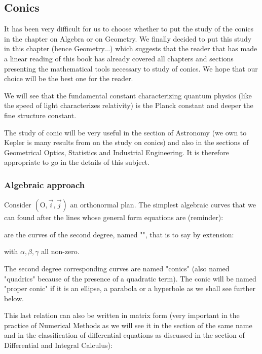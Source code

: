 	\subsection{Conics}\label{conics}
	It has been very difficult for us to choose whether to put the study of the conics in the chapter on Algebra or on Geometry. We finally decided to put this study in this chapter (hence Geometry...) which suggests that the reader that has made a linear reading of this book has already covered all chapters and sections presenting the mathematical tools necessary to study of conics. We hope that our choice will be the best one for the reader.

	\begin{tcolorbox}[title=Remark,colframe=black,arc=10pt]
	We will see that the fundamental constant characterizing quantum physics (like the speed of light characterizes relativity) is the Planck constant and deeper the fine structure constant.
	\end{tcolorbox}	
	
	The study of conic will be very useful in the section of Astronomy (we own to Kepler is  many results from on the study on conics) and also in the sections of Geometrical Optics, Statistics and Industrial Engineering. It is therefore appropriate to go in the details of this subject.

	\subsubsection{Algebraic approach}
	Consider $(\text{O},\vec{i},\vec{j})$ an orthonormal plan. The simplest algebraic curves that we can found after the lines whose general form equations are (reminder):
	
are the curves of the second degree, named "", that is to say by extension:
	
with $\alpha,\beta,\gamma$ all non-zero.

	The second degree corresponding curves are named "conics" (also named "quadrics\label{quadrics}" because of the presence of a quadratic term). The conic will be named "proper conic" if it is an ellipse, a parabola or a hyperbole as we shall see further below.

This last relation can also be written in matrix form (very important in the practice of Numerical Methods as we will see it in the section of the same name and in the classification of differential equations as discussed in the section of Differential and Integral Calculus):
	
